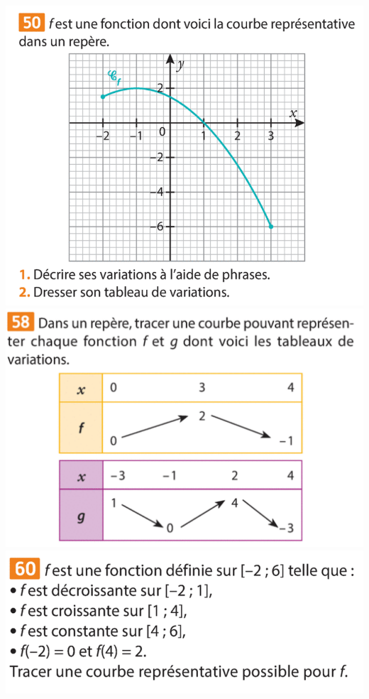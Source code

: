\documentclass{article}
\begin{document}
\begin{minipage}{0.45\textwidth}
\begin{center}
\end{center}    
\end{minipage}
\hfill\vline\hfill
\begin{minipage}{0.45\textwidth}
\begin{center}
\includegraphics[width=\textwidth]{Exercice_4.png}
\includegraphics[width=\textwidth]{Exercice_6.png}
\includegraphics[width=\textwidth]{Exercice_7.png}

\end{center}    
\end{minipage}
\end{document}

